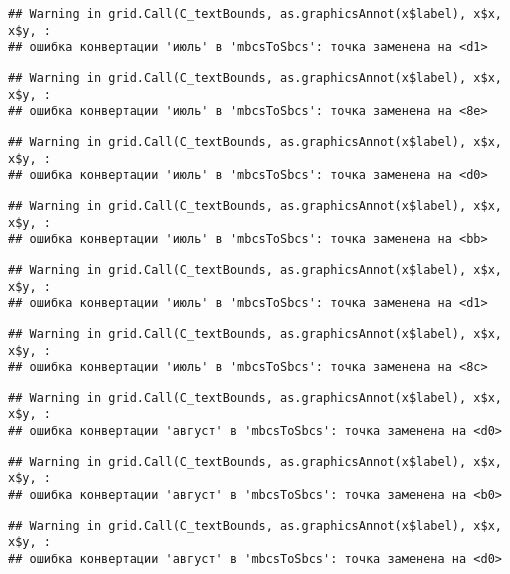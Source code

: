 \documentclass[
]{article}
\begin{document}
\begin{verbatim}
## Warning in grid.Call(C_textBounds, as.graphicsAnnot(x$label), x$x, x$y, :
## ошибка конвертации 'июль' в 'mbcsToSbcs': точка заменена на <d1>
\end{verbatim}

\begin{verbatim}
## Warning in grid.Call(C_textBounds, as.graphicsAnnot(x$label), x$x, x$y, :
## ошибка конвертации 'июль' в 'mbcsToSbcs': точка заменена на <8e>
\end{verbatim}

\begin{verbatim}
## Warning in grid.Call(C_textBounds, as.graphicsAnnot(x$label), x$x, x$y, :
## ошибка конвертации 'июль' в 'mbcsToSbcs': точка заменена на <d0>
\end{verbatim}

\begin{verbatim}
## Warning in grid.Call(C_textBounds, as.graphicsAnnot(x$label), x$x, x$y, :
## ошибка конвертации 'июль' в 'mbcsToSbcs': точка заменена на <bb>
\end{verbatim}

\begin{verbatim}
## Warning in grid.Call(C_textBounds, as.graphicsAnnot(x$label), x$x, x$y, :
## ошибка конвертации 'июль' в 'mbcsToSbcs': точка заменена на <d1>
\end{verbatim}

\begin{verbatim}
## Warning in grid.Call(C_textBounds, as.graphicsAnnot(x$label), x$x, x$y, :
## ошибка конвертации 'июль' в 'mbcsToSbcs': точка заменена на <8c>
\end{verbatim}

\begin{verbatim}
## Warning in grid.Call(C_textBounds, as.graphicsAnnot(x$label), x$x, x$y, :
## ошибка конвертации 'август' в 'mbcsToSbcs': точка заменена на <d0>
\end{verbatim}

\begin{verbatim}
## Warning in grid.Call(C_textBounds, as.graphicsAnnot(x$label), x$x, x$y, :
## ошибка конвертации 'август' в 'mbcsToSbcs': точка заменена на <b0>
\end{verbatim}

\begin{verbatim}
## Warning in grid.Call(C_textBounds, as.graphicsAnnot(x$label), x$x, x$y, :
## ошибка конвертации 'август' в 'mbcsToSbcs': точка заменена на <d0>
\end{verbatim}
\end{document}
